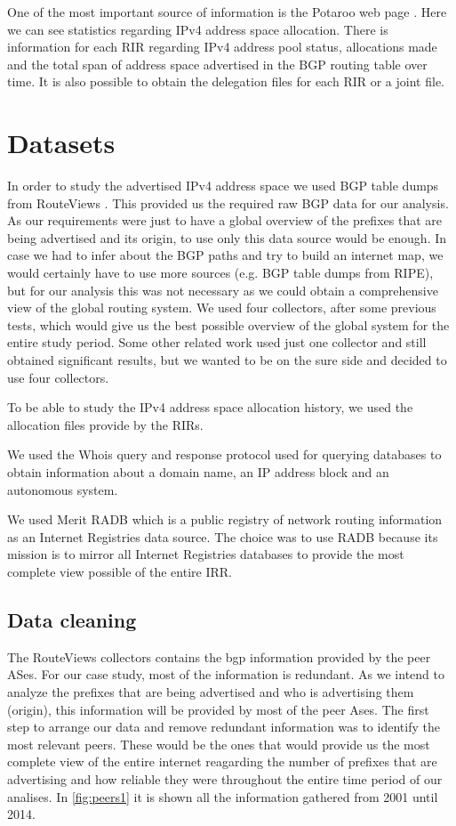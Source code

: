 \documentclass[11pt,a4paper]{scrreprt}
\begin{document}
One of the most important source of information is the Potaroo web page \cite{Potaroo}. 
Here we can see statistics regarding IPv4 address space allocation. There is information for each RIR regarding IPv4 address pool status, allocations made and the total span of address space advertised in the BGP routing table over time. It is also possible to obtain the delegation files for each RIR or a joint file.


\chapter{Datasets}

In order to study the advertised IPv4 address space we used BGP table dumps from RouteViews \cite{RouteViews}. This provided us the required raw BGP data for our analysis. As our requirements were just to have a global overview of the prefixes that are being advertised and its origin, to use only this data source would be enough. In case we had to infer about the BGP paths and try to build an internet map, we would certainly have to use more sources (e.g. BGP table dumps from RIPE), but for our analysis this was not necessary as we could obtain a comprehensive view of the global routing system.
We used four collectors, after some previous tests, which would give us the best possible overview of the global system for the entire study period. Some other related work \cite{Address_Space_Deaggregation} used just one collector and still obtained significant results, but we wanted to be on the sure side and decided to use four collectors. 

To be able to study the IPv4 address space allocation history, we used the allocation files \cite{Potaroo} provide by the RIRs.

We used the Whois \cite{Whois} query and response protocol used for querying databases to obtain information about a domain name, an IP address block and an autonomous system. 

We used Merit RADB \cite{RADB} which is a public registry of network routing information as an Internet Registries data source. The choice was to use RADB because its mission is to mirror all Internet Registries  databases to provide the most complete view possible of the entire IRR. 

\section{Data cleaning}
The RouteViews collectors contains the bgp information provided by the peer ASes. For our case study, most of the information is redundant. As we intend to analyze the prefixes that are being advertised and who is advertising them (origin), this information will be provided by most of the peer Ases. The first step to arrange our data and remove redundant information was to identify the most relevant peers. These would be the ones that would provide us the most complete view of the entire internet reagarding the number of prefixes that are advertising and how reliable they were throughout the entire time period of our analises. In \ref{fig:peers1} it is shown all the information gathered from 2001 until 2014. 
\end{document}
